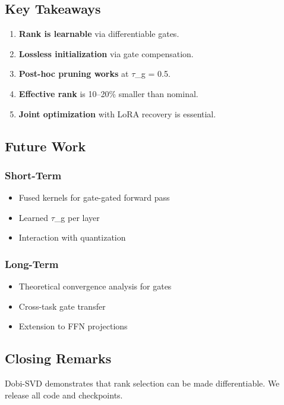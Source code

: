 \subsection{Key Takeaways}

\begin{enumerate}
\item \textbf{Rank is learnable} via differentiable gates.
\item \textbf{Lossless initialization} via gate compensation.
\item \textbf{Post-hoc pruning works} at $\tau$\_g = 0.5.
\item \textbf{Effective rank} is 10--20\% smaller than nominal.
\item \textbf{Joint optimization} with LoRA recovery is essential.

\end{enumerate}
\subsection{Future Work}

\subsubsection{Short-Term}
\begin{itemize}
\item Fused kernels for gate-gated forward pass
\item Learned $\tau$\_g per layer
\item Interaction with quantization

\end{itemize}
\subsubsection{Long-Term}
\begin{itemize}
\item Theoretical convergence analysis for gates
\item Cross-task gate transfer
\item Extension to FFN projections

\end{itemize}
\subsection{Closing Remarks}

Dobi-SVD demonstrates that rank selection can be made differentiable. We 
release all code and checkpoints.

